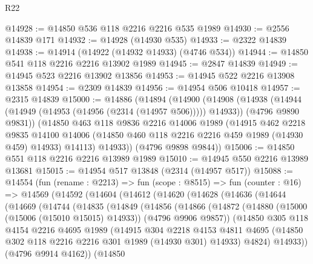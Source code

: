 \begin{lexlean}{R22}
\begin{coremodule}
@14928 := @14850 @536 @118 @2216 @2216 @535 @1989
@14930 := @2556 @14839 @171
@14932 := @14928 (@14930 @535)
@14933 := @2322 @14839
@14938 := @14914 (@14922 (@14932 @14933) (@4746 @534))
@14944 := @14850 @541 @118 @2216 @2216 @13902 @1989
@14945 := @2847 @14839
@14949 := @14945 @523 @2216 @13902 @13856
@14953 := @14945 @522 @2216 @13908 @13858
@14954 := @2309 @14839
@14956 := @14954 @506 @10418
@14957 := @2315 @14839
@15000 := @14886
    (@14894
      (@14900
        (@14908
          (@14938 (@14944 (@14949 (@14953 (@14956 (@2314 (@14957 @506))))) @14933))
          (@4796 @9890 @9831))
        (@14850
          @463
          @118
          @9836
          @2216
          @14006
          @1989
          (@14915
            @462
            @2218
            @9835
            @14100
            @14006
            (@14850 @460 @118 @2216 @2216 @459 @1989 (@14930 @459) @14933)
            @14113)
          @14933))
      (@4796 @9898 @9844))
@15006 := @14850 @551 @118 @2216 @2216 @13989 @1989
@15010 := @14945 @550 @2216 @13989 @13681
@15015 := @14954 @517 @13848 (@2314 (@14957 @517))
@15088 := @14554
    (fun (rename : @2213) =>
    fun (scope : @8515) =>
    fun (counter : @16) =>
    @14569
      (@14592
        (@14604
          (@14612
            (@14620
              (@14628
                (@14636
                  (@14644
                    (@14669
                      (@14744
                        (@14835
                          (@14849
                            (@14856
                              (@14866
                                (@14872
                                  (@14880
                                    (@15000 (@15006 (@15010 @15015) @14933))
                                    (@4796 @9906 @9857))
                                  (@14850
                                    @305
                                    @118
                                    @4154
                                    @2216
                                    @4695
                                    @1989
                                    (@14915
                                      @304
                                      @2218
                                      @4153
                                      @4811
                                      @4695
                                      (@14850 @302 @118 @2216 @2216 @301 @1989 (@14930 @301) @14933)
                                      @4824)
                                    @14933))
                                (@4796 @9914 @4162))
                              (@14850

\end{coremodule}
\end{lexlean}
